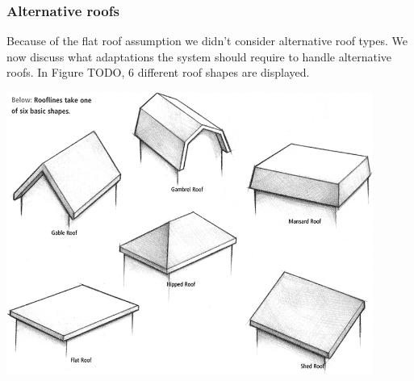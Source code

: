 \documentclass[10pt]{article}
\begin{document}
\subsubsection{Alternative roofs}


Because of the flat roof assumption we didn't consider alternative roof types.
We now discuss what adaptations the system should require to handle alternative roofs.
In Figure TODO, 6 different roof shapes are displayed.\\

\begin{Figure}[!ht]
\centering
\includegraphics[width=12cm]{img/typesOfRoofs.png}
\end{Figure}
\end{document}
